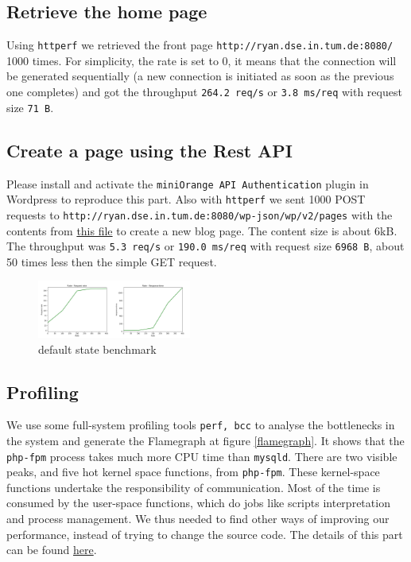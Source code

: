 \subsection{Retrieve the home page}

Using \texttt{httperf} we retrieved the front page \texttt{http://ryan.dse.in.tum.de:8080/} 1000 times. For simplicity, the rate is set to 0, it means that the connection will be generated sequentially (a new connection is initiated as soon as the previous one completes) and got the throughput \texttt{264.2 req/s} or \texttt{3.8 ms/req} with request size \texttt{71 B}.

\subsection{Create a page using the Rest API}

Please install and activate the \texttt{miniOrange API Authentication} plugin in Wordpress to reproduce this part.
Also with \texttt{httperf} we sent 1000 POST requests to \texttt{http://ryan.dse.in.tum.de:8080/wp-json/wp/v2/pages} with the contents from \href{https://github.com/danbachar/swiss-knife/blob/master/task1/benchmark/bench2_content}{this file} to create a new blog page. The content size is about 6kB.\\
The throughput was \texttt{5.3 req/s} or \texttt{190.0 ms/req} with request size \texttt{6968 B}, about 50 times less then the simple GET request.

\begin{figure}
\centering 
\includegraphics[width=0.45\textwidth]{benchmark/res/bm_5.png}
\caption{default state benchmark} 
\label{bm_5}
\end{figure}

\subsection{Profiling}
We use some full-system profiling tools \texttt{perf, bcc} to analyse the bottlenecks in the system and generate the Flamegraph at figure \ref{flamegraph}. It shows that the \texttt{php-fpm} process takes much more CPU time than \texttt{mysqld}. There are two visible peaks, and five hot kernel space functions, from \texttt{php-fpm}. These kernel-space functions undertake the responsibility of communication. Most of the time is consumed by the user-space functions, which do jobs like scripts interpretation and process management. We thus needed to find other ways of improving our performance, instead of trying to change the source code.
The details of this part can be found \href{https://github.com/danbachar/swiss-knife/blob/master/task1/benchmark/optimization.md}{here}. 

